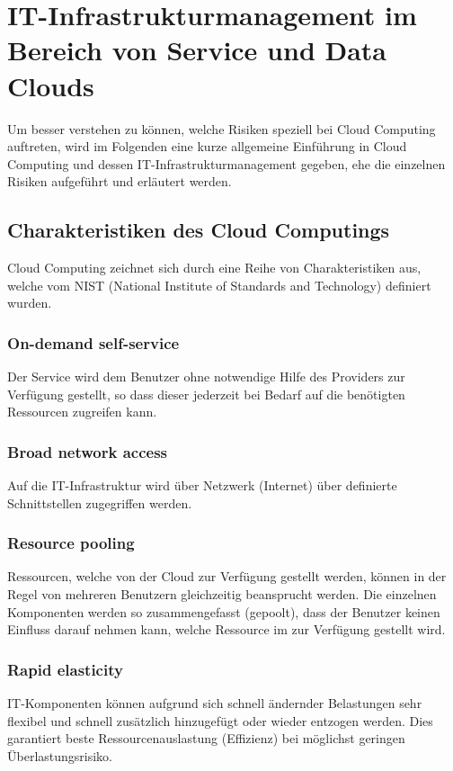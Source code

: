 \documentclass{report}
\begin{document}
\section{IT-Infrastrukturmanagement im Bereich von Service und Data Clouds}
Um besser verstehen zu können, welche Risiken speziell bei Cloud Computing auftreten, wird im Folgenden eine kurze allgemeine Einführung in Cloud Computing und dessen IT-Infrastrukturmanagement gegeben, ehe die einzelnen Risiken aufgeführt und erläutert werden. \cite{koe2013} \cite{haa2013}

\subsection{Charakteristiken des Cloud Computings}
Cloud Computing zeichnet sich durch eine Reihe von Charakteristiken aus, welche vom NIST (National Institute of Standards and Technology) definiert wurden.

\subsubsection{On-demand self-service}
Der Service wird dem Benutzer ohne notwendige Hilfe des Providers zur Verfügung gestellt, so dass dieser jederzeit bei Bedarf auf die benötigten Ressourcen zugreifen kann.

\subsubsection{Broad network access}
Auf die IT-Infrastruktur wird über Netzwerk (Internet) über definierte Schnittstellen zugegriffen werden.

\subsubsection{Resource pooling}
Ressourcen, welche von der Cloud zur Verfügung gestellt werden, können in der Regel von mehreren Benutzern gleichzeitig beansprucht werden. Die einzelnen Komponenten werden so zusammengefasst (gepoolt), dass der Benutzer keinen Einfluss darauf nehmen kann, welche Ressource im zur Verfügung gestellt wird.

\subsubsection{Rapid elasticity}
IT-Komponenten können aufgrund sich schnell ändernder Belastungen sehr flexibel und schnell zusätzlich hinzugefügt oder wieder entzogen werden. Dies garantiert beste Ressourcenauslastung (Effizienz) bei möglichst geringen Überlastungsrisiko.
\end{document}
